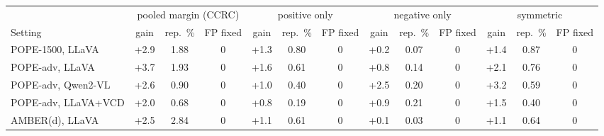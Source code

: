 \begin{tabular}{lcccccccccccc}
\toprule
 & \multicolumn{3}{c}{pooled margin (CCRC)} & \multicolumn{3}{c}{positive only} & \multicolumn{3}{c}{negative only} & \multicolumn{3}{c}{symmetric}\\
\cmidrule(lr){2-4}\cmidrule(lr){5-7}\cmidrule(lr){8-10}\cmidrule(lr){11-13}
Setting & gain & rep.\ \% & FP fixed & gain & rep.\ \% & FP fixed & gain & rep.\ \% & FP fixed & gain & rep.\ \% & FP fixed\\
\midrule
POPE-1500, LLaVA & +2.9 & 1.88 & 0 & +1.3 & 0.80 & 0 & +0.2 & 0.07 & 0 & +1.4 & 0.87 & 0\\
POPE-adv, LLaVA & +3.7 & 1.93 & 0 & +1.6 & 0.61 & 0 & +0.8 & 0.14 & 0 & +2.1 & 0.76 & 0\\
POPE-adv, Qwen2-VL & +2.6 & 0.90 & 0 & +1.0 & 0.40 & 0 & +2.5 & 0.20 & 0 & +3.2 & 0.59 & 0\\
POPE-adv, LLaVA+VCD & +2.0 & 0.68 & 0 & +0.8 & 0.19 & 0 & +0.9 & 0.21 & 0 & +1.5 & 0.40 & 0\\
AMBER(d), LLaVA & +2.5 & 2.84 & 0 & +1.1 & 0.61 & 0 & +0.1 & 0.03 & 0 & +1.1 & 0.64 & 0\\
\bottomrule
\end{tabular}
